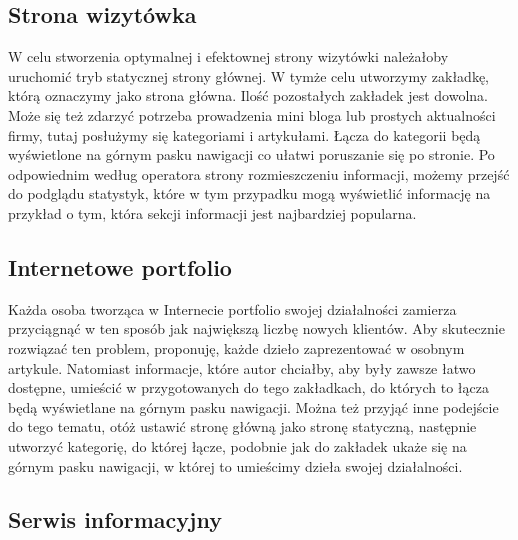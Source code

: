 \documentclass[openright]{xmgr}
\begin{document}
\subsection{Strona wizytówka}

W celu stworzenia optymalnej i efektownej strony wizytówki należałoby uruchomić tryb statycznej strony głównej. W tymże celu utworzymy zakładkę, którą oznaczymy jako strona główna. Ilość pozostałych zakładek jest dowolna. Może się też zdarzyć potrzeba prowadzenia mini bloga lub prostych aktualności firmy, tutaj posłużymy się kategoriami i artykułami. Łącza do kategorii będą wyświetlone na górnym pasku nawigacji co ułatwi poruszanie się po stronie.  Po odpowiednim według operatora strony rozmieszczeniu informacji, możemy przejść do podglądu statystyk, które w tym przypadku mogą wyświetlić informację na przykład o tym, która sekcji informacji jest najbardziej popularna.

\subsection{Internetowe portfolio}

Każda osoba tworząca w Internecie portfolio swojej działalności zamierza przyciągnąć w ten sposób jak największą liczbę nowych klientów. Aby skutecznie rozwiązać ten problem, proponuję, każde dzieło zaprezentować w osobnym artykule. Natomiast informacje, które autor chciałby, aby były zawsze łatwo dostępne, umieścić w przygotowanych do tego zakładkach, do których to łącza będą wyświetlane na górnym pasku nawigacji. Można też przyjąć inne podejście do tego tematu, otóż ustawić stronę główną jako stronę statyczną, następnie utworzyć kategorię, do której łącze, podobnie jak do zakładek ukaże się na górnym pasku nawigacji, w której to umieścimy dzieła swojej działalności.

\subsection{Serwis informacyjny}
\end{document}
